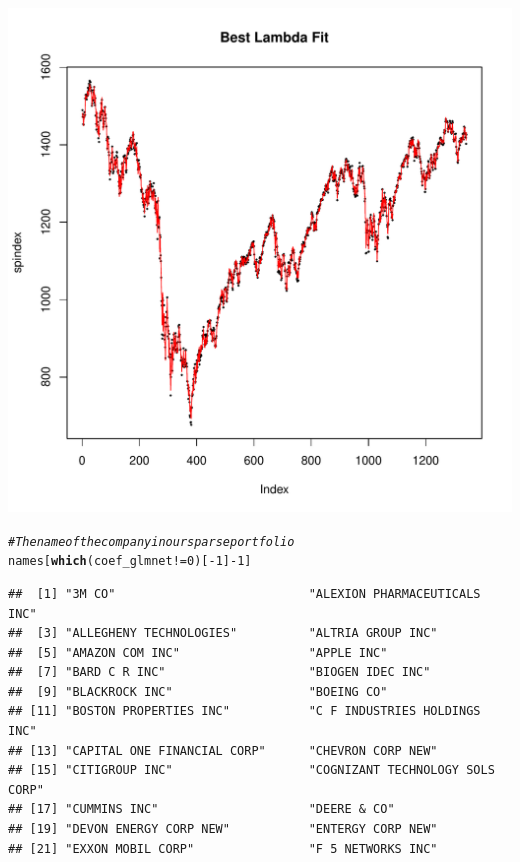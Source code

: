 \documentclass{article}\usepackage[]{graphicx}\usepackage[]{color}
\makeatletter
\def\maxwidth{ %
  \ifdim\Gin@nat@width>\linewidth
    \linewidth
  \else
    \Gin@nat@width
  \fi
}
\newcommand{\hlnum}[1]{\textcolor[rgb]{0.686,0.059,0.569}{#1}}%
\newcommand{\hlcom}[1]{\textcolor[rgb]{0.678,0.584,0.686}{\textit{#1}}}%
\newcommand{\hlopt}[1]{\textcolor[rgb]{0,0,0}{#1}}%
\newcommand{\hlstd}[1]{\textcolor[rgb]{0.345,0.345,0.345}{#1}}%
\newcommand{\hlkwd}[1]{\textcolor[rgb]{0.737,0.353,0.396}{\textbf{#1}}}%
\newenvironment{kframe}{%
 \def\at@end@of@kframe{}%
 \ifinner\ifhmode%
  \def\at@end@of@kframe{\end{minipage}}%
  \begin{minipage}{\columnwidth}%
 \fi\fi%
 \def\FrameCommand##1{\hskip\@totalleftmargin \hskip-\fboxsep
 \colorbox{shadecolor}{##1}\hskip-\fboxsep
     \hskip-\linewidth \hskip-\@totalleftmargin \hskip\columnwidth}%
 \MakeFramed {\advance\hsize-\width
   \@totalleftmargin\z@ \linewidth\hsize
   \@setminipage}}%
 {\par\unskip\endMakeFramed%
 \at@end@of@kframe}
\newenvironment{knitrout}{}{} %
\makeatother
\begin{document}
\begin{knitrout}
\begin{kframe}
\begin{alltt}
\end{alltt}
\end{kframe}
\includegraphics[width=\maxwidth]{figure/minimal-Stock4} 
\begin{kframe}\begin{alltt}
\hlcom{# The name of the company in our sparse portfolio}
\hlstd{names[}\hlkwd{which}\hlstd{(coef_glmnet} \hlopt{!=} \hlnum{0}\hlstd{)[}\hlopt{-}\hlnum{1}\hlstd{]} \hlopt{-} \hlnum{1}\hlstd{]}
\end{alltt}
\begin{verbatim}
##  [1] "3M CO"                           "ALEXION PHARMACEUTICALS INC"    
##  [3] "ALLEGHENY TECHNOLOGIES"          "ALTRIA GROUP INC"               
##  [5] "AMAZON COM INC"                  "APPLE INC"                      
##  [7] "BARD C R INC"                    "BIOGEN IDEC INC"                
##  [9] "BLACKROCK INC"                   "BOEING CO"                      
## [11] "BOSTON PROPERTIES INC"           "C F INDUSTRIES HOLDINGS INC"    
## [13] "CAPITAL ONE FINANCIAL CORP"      "CHEVRON CORP NEW"               
## [15] "CITIGROUP INC"                   "COGNIZANT TECHNOLOGY SOLS CORP" 
## [17] "CUMMINS INC"                     "DEERE & CO"                     
## [19] "DEVON ENERGY CORP NEW"           "ENTERGY CORP NEW"               
## [21] "EXXON MOBIL CORP"                "F 5 NETWORKS INC"               

\end{verbatim}
\end{kframe}
\end{knitrout}
\end{document}
